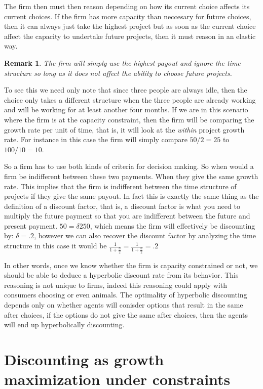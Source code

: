 \documentclass[12pt]{report}
\newtheorem{remark}{Remark}
\numberwithin{equation}{section}
\begin{document}
The firm then must then reason depending on how its current choice affects its current choices. If the firm has more capacity than neccesary for future choices, then it can always just take the highest project but as soon as the current choice affect the capacity to undertake future projects, then it must reason in an elastic way. 

\begin{remark}
The firm will simply use the highest payout and ignore the time structure so long as it does not affect the ability to choose future projects. 
\end{remark}

To see this we need only note that since three people are always idle, then the choice only takes a different structure when the three people are already working and will be working for at least another four months. If we are in this scenario where the firm is at the capacity constraint, then the firm will be comparing the growth rate per unit of time, that is, it will look at the \textit{within} project growth rate. For instance in this case the firm will simply compare $50/2=25$ to $100/10=10$. 

So a firm has to use both kinds of criteria for decision making. So when would a firm be indifferent between these two payments. When they give the same growth rate. This implies that the firm is indifferent between the time structure of projects if they give the same payout. In fact this is exactly the same thing as the definition of a discount factor, that is, a discount factor is what you need to multiply the future payment so that you are indifferent between the future and present payment. $50= \delta 250$, which means the firm will effectively be discounting by: $\delta = .2$, however we can also recover the discount factor by analyzing the time structure in this case it would be $\frac{1}{1+\frac{8}{2}}=\frac{1}{1+\frac{8}{2}}=.2$

In other words, once we know whether the firm is capacity constrained or not, we should be able to deduce a hyperbolic discount rate from its behavior. This reasoning is not unique to firms, indeed this reasoning could apply with consumers choosing or even animals. The optimality of hyperbolic discounting depends only on whether agents will conisder options that result in the same after choices, if the options do not give the same after choices, then the agents will end up hyperbolically discounting. 

\section{Discounting as growth maximization under constraints}
\end{document}
